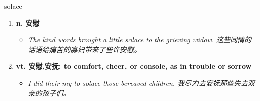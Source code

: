 
\begin{frame}
{\huge solace}
\begin{center}
\begin{enumerate}\Large
  \item \textbf{n. 安慰}
  \begin{itemize}
    \item \em{\Large{The kind words brought a little solace to the grieving widow. 这些同情的话语给痛苦的寡妇带来了些许安慰。}}
  \end{itemize}
  \item \textbf{vt. 安慰,安抚: to comfort, cheer, or console, as in trouble or sorrow}
  \begin{itemize}
    \item \em{\Large{I did their my to solace those bereaved children. 我尽力去安抚那些失去双亲的孩子们。}}
  \end{itemize}
\end{enumerate}
\end{center}
\end{frame}
